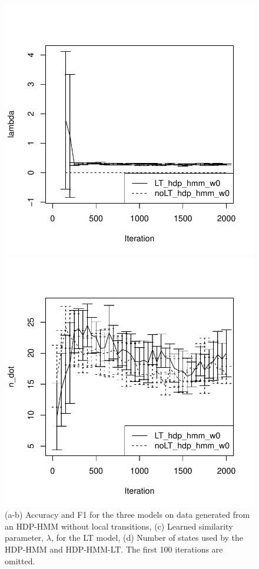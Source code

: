 \begin{figure}[tb]
\vspace{-0.3in}

  \begin{minipage}{0.40\textwidth}
  \includegraphics[width = \textwidth]{fig/synth16/w0/noLT_s0/lambda.pdf}
\end{minipage}
  \begin{minipage}{0.40\textwidth}
  \includegraphics[width = \textwidth]{fig/synth16/w0/noLT_s0/n_dot.pdf}
\end{minipage}
  \caption{(a-b) Accuracy and F1 for the three models on data generated 
    from an HDP-HMM without local transitions, (c) Learned similarity
    parameter, $\lambda$,
  for the LT model, (d) Number of states used by
  the HDP-HMM and HDP-HMM-LT.  The first 100 iterations are omitted.}
  \label{fig:synthetic-results}
\end{figure}

